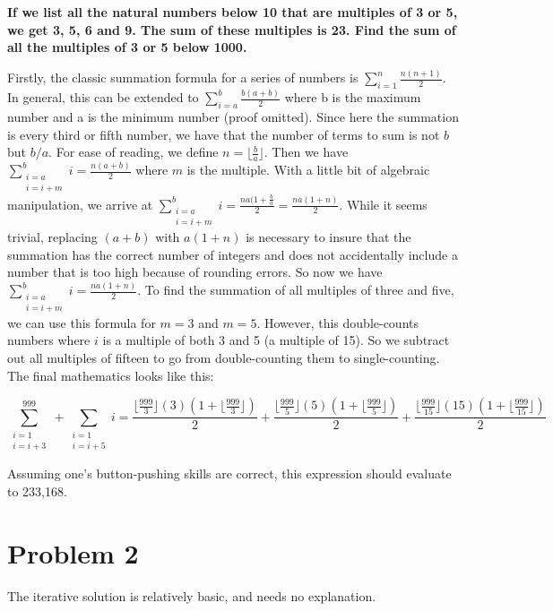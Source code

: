 \documentclass{article}
\begin{document}
\textbf{If we list all the natural numbers below 10 that are multiples of 3 or 5, we get 3, 
5, 6 and 9. The sum of these multiples is 23. Find the sum of all the multiples of 3 or 5 
below 1000.}

Firstly, the classic summation formula for a series of numbers is 
$\sum\limits_{i=1}^{n}\frac{n(n+1)}{2}$. In general, this can be extended to 
$\sum\limits_{i=a}^{b}\frac{b(a+b)}{2}$ where b is the maximum number and a is the minimum 
number (proof omitted). Since here the summation is every third or fifth number, we have that 
the number of terms to sum is not $b$ but $b/a$. For ease of reading, we define 
$n = \lfloor\frac{b}{a}\rfloor$. Then we have 
$\sum\limits_{\substack{i=a \\ i=i+m}}^{b}i=\frac{n(a+b)}{2}$ where $m$ is the multiple. With 
a little bit of algebraic manipulation, we arrive at
$\sum\limits_{\substack{i=a \\ i=i+m}}^{b}i=\frac{na(1+\frac{b}{a}}{2}=\frac{na(1+n)}{2}$.
While it seems trivial, replacing $(a + b)$ with $a(1 + n)$ is necessary to insure that the 
summation has the correct number of integers and does not accidentally include a number that 
is too high because of rounding errors. So now we have
$\sum\limits_{\substack{i=a \\ i=i+m}}^{b}i=\frac{na(1+n)}{2}$. To find the summation of all 
multiples of three and five, we can use this formula for $m = 3$ and $m = 5$. However, this 
double-counts numbers where $i$ is a multiple of both 3 and 5 (a multiple of 15). So we 
subtract out all multiples of fifteen to go from double-counting them to single-counting. The
final mathematics looks like this:

\[
\sum\limits_{\substack{i=1 \\ i=i+3}}^{999} + \sum\limits_{\substack{i=1 \\ i=i+5}} i = 
\frac{\lfloor\frac{999}{3}\rfloor(3)(1+\lfloor\frac{999}{3}\rfloor)}{2} + 
\frac{\lfloor\frac{999}{5}\rfloor(5)(1+\lfloor\frac{999}{5}\rfloor)}{2} + 
\frac{\lfloor\frac{999}{15}\rfloor(15)(1+\lfloor\frac{999}{15}\rfloor)}{2}
\]

Assuming one’s button-pushing skills are correct, this expression should evaluate to 233,168.

\section{Problem 2}

The iterative solution is relatively basic, and needs no explanation.
\end{document}
